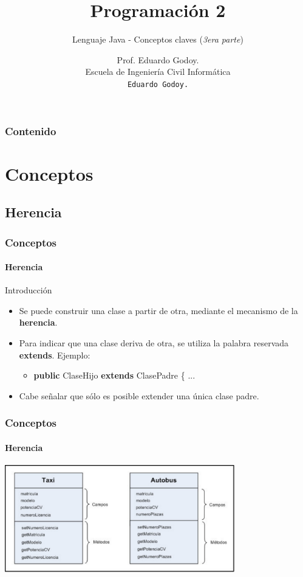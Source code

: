 \documentclass{beamer}
\title[\textbf{Programaci\'on 2}]{\textbf{Programaci\'on 2}}
\subtitle{Lenguaje Java - Conceptos claves (\emph{3era parte})}
\author[Rodrigo Olivares]
{
	Prof. Eduardo Godoy. \\
	\vspace{0.5mm}
	Escuela de Ingenier\'ia Civil Inform\'atica \\
	\vspace{0.5mm}
	\texttt{\normalsize Eduardo Godoy.}
}
\institute[Universidad de Valpara\'iso]
\begin{document}
	\begin{frame}
		\titlepage
	\end{frame}

	\begin{frame}
		\frametitle{Contenido}
		\tableofcontents%
	\end{frame}

	\section{Conceptos}

		\subsection{Herencia}

		\begin{frame}
			\frametitle{Conceptos}
			\framesubtitle{Herencia}

			\begin{block}{Introducci\'on}
				\begin{itemize}
  					\item Se puede construir una clase a partir de otra, mediante el mecanismo de la \textbf{herencia}.
					\item Para indicar que una clase deriva de otra, se utiliza la palabra reservada \textbf{extends}. Ejemplo:
					\begin{itemize}
  						\item \textbf{public} ClaseHijo \textbf{extends} ClasePadre \{ ...
					\end{itemize}
					\item Cabe se\~nalar que s\'olo es posible extender una \'unica clase padre.
				\end{itemize}
			\end{block}
		\end{frame}

		\begin{frame}
			\frametitle{Conceptos}
			\framesubtitle{Herencia}

			\begin{center}
				\includegraphics[width=10cm]{images/herencia_1.pdf}
			\end{center}
		\end{frame}
\end{document}
